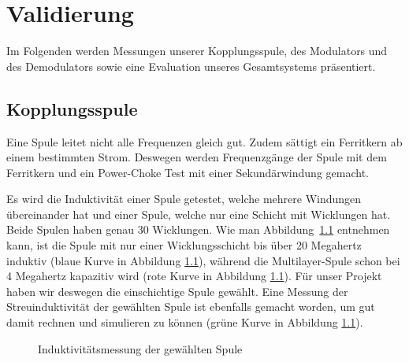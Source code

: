\chapter{Validierung}
\label{chap:validierung}

Im Folgenden werden  Messungen unserer Kopplungsspule, des  Modulators und des
Demodulators sowie eine Evaluation unseres Gesamtsystems pr\"asentiert.

\section{Kopplungsspule}
\label{sec:val:coupling:coil}

Eine  Spule  leitet nicht  alle  Frequenzen  gleich gut. Zudem  s\"attigt  ein
Ferritkern  ab einem  bestimmten  Strom. Deswegen  werden Frequenzg\"ange  der
Spule mit dem Ferritkern und  ein Power-Choke Test mit einer Sekund\"arwindung
gemacht.

Es   wird   die   Induktivit\"at   einer  Spule   getestet,   welche   mehrere
Windungen  \"ubereinander  hat  und  einer  Spule,  welche  nur  eine  Schicht
mit  Wicklungen   hat. Beide  Spulen   haben  genau  30   Wicklungen. Wie  man
Abbildung~\ref{fig:meas:coupling:coil:L}  entnehmen kann,  ist  die Spule  mit
nur  einer Wicklungsschicht  bis  \"uber 20  Megahertz  induktiv (blaue  Kurve
in Abbildung  \ref{fig:meas:coupling:coil:L}), w\"ahrend  die Multilayer-Spule
schon   bei   4   Megahertz   kapazitiv  wird   (rote   Kurve   in   Abbildung
\ref{fig:meas:coupling:coil:L}). F\"ur  unser   Projekt  haben   wir  deswegen
die  einschichtige  Spule   gew\"ahlt. Eine  Messung  der  Streuinduktivit\"at
der   gew\"ahlten  Spule   ist  ebenfalls   gemacht  worden,   um  gut   damit
rechnen   und   simulieren   zu   k\"onnen   (gr\"une   Kurve   in   Abbildung
\ref{fig:meas:coupling:coil:L}).

\clearpage
\begin{figure}[h!tb]
    \centering
    
    \caption[Messresultate Kopplungsspule: Induktivit\"at]{Induktivit\"atsmessung der gew\"ahlten Spule}
    \label{fig:meas:coupling:coil:L}
\end{figure}

